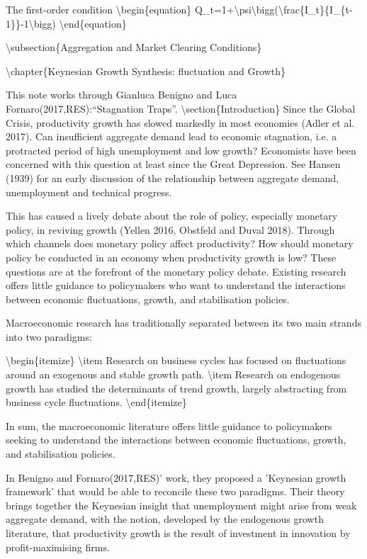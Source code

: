 \documentclass[10pt,math=newtx,citestyle=gb7714-2015,bibstyle=gb7714-2015]{elegantbook}
\begin{document}
	The first-order condition
	\textbackslash{}begin\{equation\}
	Q\_t=1+\textbackslash{}psi\textbackslash{}bigg(\textbackslash{}frac\{I\_t\}\{I\_\{t-1\}\}-1\textbackslash{}bigg)
	\textbackslash{}end\{equation\}
	
	
	\textbackslash{}subsection\{Aggregation and Market Clearing Conditions\}
	
	\textbackslash{}chapter\{Keynesian Growth Synthesis: fluctuation and Growth\}
	
	This note works through Gianluca Benigno and Luca Fornaro(2017,RES):``Stagnation Traps''.
	\textbackslash{}section\{Introduction\}
	Since the Global Crisis, productivity growth has slowed markedly in most economies (Adler et al. 2017). Can insufficient aggregate demand lead to economic stagnation, i.e. a protracted period of high unemployment and low growth? Economists have been concerned with this question at least since the Great Depression. See Hansen (1939) for an early discussion of the relationship between aggregate demand, unemployment and technical progress. 
	
	This has caused a lively debate about the role of policy, especially monetary policy, in reviving growth (Yellen 2016, Obstfeld and Duval 2018). Through which channels does monetary policy affect productivity? How should monetary policy be conducted in an economy when productivity growth is low? These questions are at the forefront of the monetary policy debate. Existing research offers little guidance to policymakers who want to understand the interactions between economic fluctuations, growth, and stabilisation policies. 
	
	Macroeconomic research has traditionally separated between its two main strands into two paradigms:
	
	\textbackslash{}begin\{itemize\}
	\textbackslash{}item Research on business cycles has focused on fluctuations around an exogenous and stable growth path.
	\textbackslash{}item Research on endogenous growth has studied the determinants of trend growth, largely abstracting from business cycle fluctuations.
	\textbackslash{}end\{itemize\}
	
	In sum, the macroeconomic literature offers little guidance to policymakers seeking to understand the interactions between economic fluctuations, growth, and stabilisation policies.
	
	In Benigno and Fornaro(2017,RES)' work,  they proposed a 'Keynesian growth framework' that would be able to reconcile these two paradigms. Their theory brings together the Keynesian insight that unemployment might arise from weak aggregate demand, with the notion, developed by the endogenous growth literature, that productivity growth is the result of investment in innovation by profit-maximising firms.
	
\end{document}
